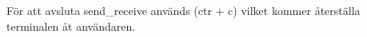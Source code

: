 För att avsluta send\_receive används (ctr + c) vilket kommer återställa
terminalen åt användaren.

% 
% 
% 
% 
% 
% 
% 
